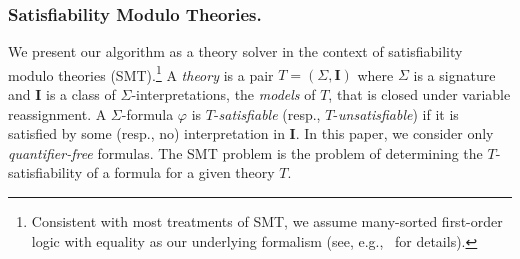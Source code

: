 \documentclass[a4paper]{llncs}
\newcommand{\Mo}{\mathbf{I}}
\begin{document}
\begin{figure}[htp]
  \begin{center}
    \scalebox{1} {
      \def\layersep{1.5cm}
    }
    \captionsetup{size=small}
    \label{fig:runningExample}
  \end{center}
\end{figure}




\subsubsection{Satisfiability Modulo Theories.}
We present our algorithm as a theory solver in the context of satisfiability
modulo theories (SMT).\footnote{Consistent with most treatments of SMT, we assume many-sorted first-order logic with
equality as our underlying formalism (see, e.g.,~\cite{BSST09} for details).}
A \emph{theory} is a pair $T = (\Sigma, \Mo)$ where 
$\Sigma$ is a signature and $\Mo$ is a class of $\Sigma$-interpretations,
the \emph{models} of $T$,
that is closed under variable reassignment.
A $\Sigma$-formula $\varphi$ is 
$T$-\emph{satisfiable} (resp., $T$-\emph{unsatisfiable})
if it is satisfied by some (resp., no) interpretation in $\Mo$.  In this paper,
we consider only \emph{quantifier-free} formulas.
The SMT problem is the problem of determining the $T$-satisfiability of a formula for a given
theory $T$.
\end{document}

